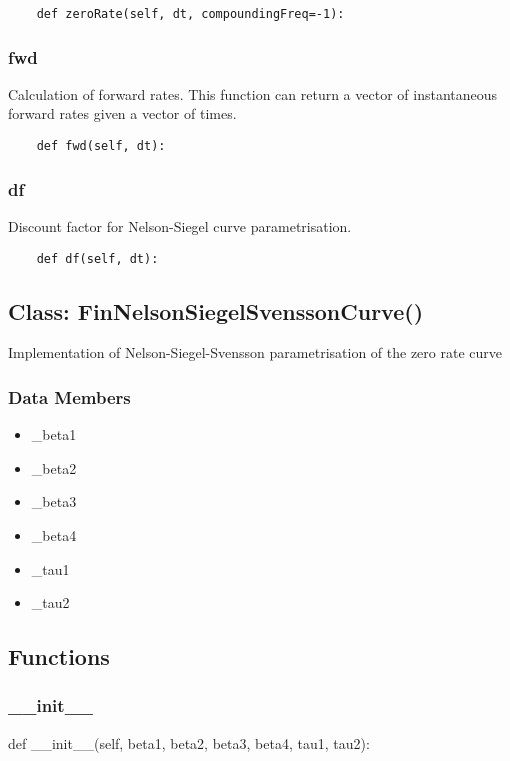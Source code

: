 \documentclass[twoside,11pt]{book}
\begin{document}
\begin{lstlisting}
    def zeroRate(self, dt, compoundingFreq=-1):
\end{lstlisting}

\subsubsection*{{\bf fwd}}
Calculation of forward rates. This function can return a vector of instantaneous forward rates given a vector of times.  

\begin{lstlisting}
    def fwd(self, dt):
\end{lstlisting}

\subsubsection*{{\bf df}}
Discount factor for Nelson-Siegel curve parametrisation.  

\begin{lstlisting}
    def df(self, dt):
\end{lstlisting}

\subsection*{Class: FinNelsonSiegelSvenssonCurve()}
Implementation of Nelson-Siegel-Svensson parametrisation of the zero rate curve  

\subsubsection*{Data Members}
\begin{itemize}
\item{\_beta1}
\item{\_beta2}
\item{\_beta3}
\item{\_beta4}
\item{\_tau1}
\item{\_tau2}
\end{itemize}

\subsection*{Functions}

\subsubsection*{{\bf \_\_init\_\_}}
def \_\_init\_\_(self, beta1, beta2, beta3, beta4, tau1, tau2): 
\end{document}
